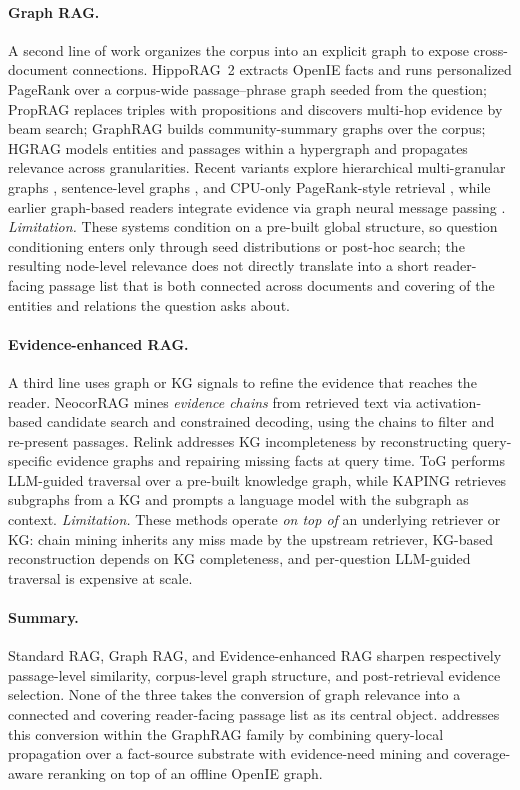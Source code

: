 \paragraph{Graph RAG.}
A second line of work organizes the corpus into an explicit graph
to expose cross-document connections. HippoRAG~2
\citep{gutierrez2025hipporag} extracts OpenIE facts and runs
personalized PageRank over a corpus-wide passage--phrase graph
seeded from the question; PropRAG \citep{wang2025proprag} replaces
triples with propositions and discovers multi-hop evidence by beam
search; GraphRAG \citep{edge2024graphrag} builds community-summary
graphs over the corpus; HGRAG \citep{hgrag2024} models entities and
passages within a hypergraph and propagates relevance across
granularities. Recent variants explore hierarchical multi-granular
graphs \citep{hu2026mgrangrag}, sentence-level graphs
\citep{liang2026sentgraph}, and CPU-only PageRank-style retrieval
\citep{wang2026sprig}, while earlier graph-based readers integrate
evidence via graph neural message passing
\citep{qiu2019dfgn,song2022evidenceintegration}.
\emph{Limitation.} These systems condition on a pre-built global
structure, so question conditioning enters only through seed
distributions or post-hoc search; the resulting node-level
relevance does not directly translate into a short reader-facing
passage list that is both connected across documents and covering
of the entities and relations the question asks about.

\paragraph{Evidence-enhanced RAG.}
A third line uses graph or KG signals to refine the evidence that
reaches the reader. NeocorRAG \citep{peng2026neocorrag} mines
\emph{evidence chains} from retrieved text via activation-based
candidate search and constrained decoding, using the chains to
filter and re-present passages. Relink \citep{huang2026relink}
addresses KG incompleteness by reconstructing query-specific
evidence graphs and repairing missing facts at query time. ToG
\citep{sun2024tog} performs LLM-guided traversal over a pre-built
knowledge graph, while KAPING \citep{baek2023kaping} retrieves
subgraphs from a KG and prompts a language model with the
subgraph as context. \emph{Limitation.} These methods operate
\emph{on top of} an underlying retriever or KG: chain mining
inherits any miss made by the upstream retriever, KG-based
reconstruction depends on KG completeness, and per-question
LLM-guided traversal is expensive at scale.

\paragraph{Summary.}
Standard RAG, Graph RAG, and Evidence-enhanced RAG sharpen
respectively passage-level similarity, corpus-level graph
structure, and post-retrieval evidence selection. None of the three
takes the conversion of graph relevance into a connected and
covering reader-facing passage list as its central object.
\methodname{} addresses this conversion within the GraphRAG family
by combining query-local propagation over a fact-source substrate
with evidence-need mining and coverage-aware reranking on top of
an offline OpenIE graph.
